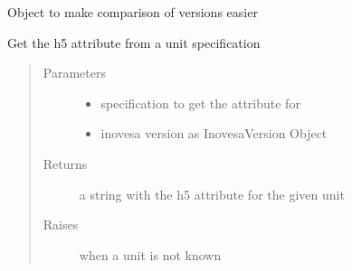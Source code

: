 \documentclass[letterpaper,10pt,openany,oneside,english]{sphinxmanual}
\begin{document}

\begin{fulllineitems}
\label{\detokenize{utils:utils.InovesaVersion}}
Object to make comparison of versions easier

\end{fulllineitems}


\begin{fulllineitems}
\label{\detokenize{utils:utils.attr_from_unit}}
Get the h5 attribute from a unit specification
\begin{quote}\begin{description}
\item[{Parameters}] \leavevmode\begin{itemize}
\item {} 
 \textendash{} specification to get the attribute for

\item {} 
 \textendash{} inovesa version as InovesaVersion Object

\end{itemize}

\item[{Returns}] \leavevmode
a string with the h5 attribute for the given unit

\item[{Raises}] \leavevmode
{\hyperref[\detokenize{utils:utils.UnitError}]{}} \textendash{} when a unit is not known

\end{description}\end{quote}

\end{fulllineitems}

\end{document}
